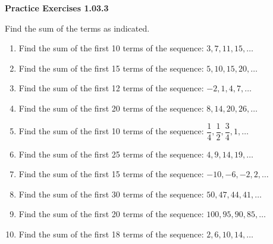 \vspace{0.3ex}
\noindent\textbf{Practice Exercises 1.03.3}

\vspace{0.2ex}

Find the sum of the terms as indicated.
\begin{enumerate}
    \item Find the sum of the first 10 terms of the sequence: $3, 7, 11, 15, \dots$
    \item Find the sum of the first 15 terms of the sequence: $5, 10, 15, 20, \dots$
    \item Find the sum of the first 12 terms of the sequence: $-2, 1, 4, 7, \dots$
    \item Find the sum of the first 20 terms of the sequence: $8, 14, 20, 26, \dots$
    \item Find the sum of the first 10 terms of the sequence: $\dfrac{1}{4}, \dfrac{1}{2}, \dfrac{3}{4}, 1, \dots$
    \item Find the sum of the first 25 terms of the sequence: $4, 9, 14, 19, \dots$
    \item Find the sum of the first 15 terms of the sequence: $-10, -6, -2, 2, \dots$
    \item Find the sum of the first 30 terms of the sequence: $50, 47, 44, 41, \dots$
    \item Find the sum of the first 20 terms of the sequence: $100, 95, 90, 85, \dots$
    \item Find the sum of the first 18 terms of the sequence: $2, 6, 10, 14, \dots$
\end{enumerate}